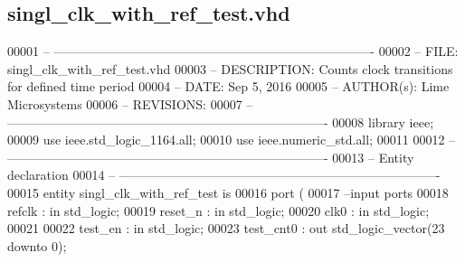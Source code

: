 \subsection{singl\+\_\+clk\+\_\+with\+\_\+ref\+\_\+test.\+vhd}
\label{singl__clk__with__ref__test_8vhd_source}

\begin{DoxyCode}
00001 \textcolor{keyword}{-- ---------------------------------------------------------------------------- }
00002 \textcolor{keyword}{-- FILE:    singl\_clk\_with\_ref\_test.vhd}
00003 \textcolor{keyword}{-- DESCRIPTION: Counts clock transitions for defined time period}
00004 \textcolor{keyword}{-- DATE:    Sep 5, 2016}
00005 \textcolor{keyword}{-- AUTHOR(s):   Lime Microsystems}
00006 \textcolor{keyword}{-- REVISIONS:}
00007 \textcolor{keyword}{-- ---------------------------------------------------------------------------- }
00008 \textcolor{vhdlkeyword}{library }\textcolor{keywordflow}{ieee};
00009 \textcolor{vhdlkeyword}{use }ieee.std\_logic\_1164.\textcolor{keywordflow}{all};
00010 \textcolor{vhdlkeyword}{use }ieee.numeric\_std.\textcolor{keywordflow}{all};
00011 
00012 \textcolor{keyword}{-- ----------------------------------------------------------------------------}
00013 \textcolor{keyword}{-- Entity declaration}
00014 \textcolor{keyword}{-- ----------------------------------------------------------------------------}
00015 \textcolor{keywordflow}{entity }singl_clk_with_ref_test \textcolor{keywordflow}{is}
00016   \textcolor{keywordflow}{port} \textcolor{vhdlchar}{(}
00017 \textcolor{keyword}{        --input ports }
00018         \textcolor{vhdlchar}{refclk}          \textcolor{vhdlchar}{:} \textcolor{keywordflow}{in} \textcolor{comment}{std\_logic};
00019         \textcolor{vhdlchar}{reset_n}         \textcolor{vhdlchar}{:} \textcolor{keywordflow}{in} \textcolor{comment}{std\_logic};
00020           \textcolor{vhdlchar}{clk0}              \textcolor{vhdlchar}{:} \textcolor{keywordflow}{in} \textcolor{comment}{std\_logic};
00021           
00022           \textcolor{vhdlchar}{test_en}           \textcolor{vhdlchar}{:} \textcolor{keywordflow}{in} \textcolor{comment}{std\_logic};
00023           \textcolor{vhdlchar}{test_cnt0}         \textcolor{vhdlchar}{:} \textcolor{keywordflow}{out} \textcolor{comment}{std\_logic\_vector}\textcolor{vhdlchar}{(}\textcolor{vhdllogic}{}\textcolor{vhdllogic}{23} \textcolor{keywordflow}{downto} \textcolor{vhdllogic}{}\textcolor{vhdllogic}{0}\textcolor{vhdlchar}{)};

\end{DoxyCode}
